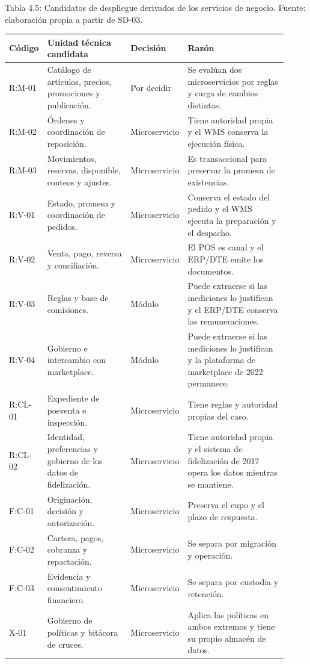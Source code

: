 \documentclass[11pt]{article}
\begin{document}
Tabla 4.5: Candidatos de despliegue derivados de los servicios de negocio. Fuente: elaboración propia a partir de SD-03.\par\nopagebreak
\begin{longtable}{@{}p{0.10\linewidth}p{0.30\linewidth}p{0.16\linewidth}p{0.36\linewidth}@{}}
\toprule Código & Unidad técnica candidata & Decisión & Razón \\
\midrule\endhead\bottomrule\endlastfoot
R:M-01 & Catálogo de artículos, precios, promociones y publicación. & Por decidir & Se evalúan dos microservicios por reglas y carga de cambios distintas. \\
R:M-02 & Órdenes y coordinación de reposición. & Microservicio & Tiene autoridad propia y el WMS conserva la ejecución física. \\
R:M-03 & Movimientos, reservas, disponible, conteos y ajustes. & Microservicio & Es transaccional para preservar la promesa de existencias. \\
R:V-01 & Estado, promesa y coordinación de pedidos. & Microservicio & Conserva el estado del pedido y el WMS ejecuta la preparación y el despacho. \\
R:V-02 & Venta, pago, reversa y conciliación. & Microservicio & El POS es canal y el ERP/DTE emite los documentos. \\
R:V-03 & Reglas y base de comisiones. & Módulo & Puede extraerse si las mediciones lo justifican y el ERP/DTE conserva las remuneraciones. \\
R:V-04 & Gobierno e intercambio con marketplace. & Módulo & Puede extraerse si las mediciones lo justifican y la plataforma de marketplace de 2022 permanece. \\
R:CL-01 & Expediente de posventa e inspección. & Microservicio & Tiene reglas y autoridad propias del caso. \\
R:CL-02 & Identidad, preferencias y gobierno de los datos de fidelización. & Microservicio & Tiene autoridad propia y el sistema de fidelización de 2017 opera los datos mientras se mantiene. \\
F:C-01 & Originación, decisión y autorización. & Microservicio & Preserva el cupo y el plazo de respuesta. \\
F:C-02 & Cartera, pagos, cobranza y repactación. & Microservicio & Se separa por migración y operación. \\
F:C-03 & Evidencia y consentimiento financiero. & Microservicio & Se separa por custodia y retención. \\
X-01 & Gobierno de políticas y bitácora de cruces. & Microservicio & Aplica las políticas en ambos extremos y tiene su propio almacén de datos. \\
\end{longtable}
\end{document}
